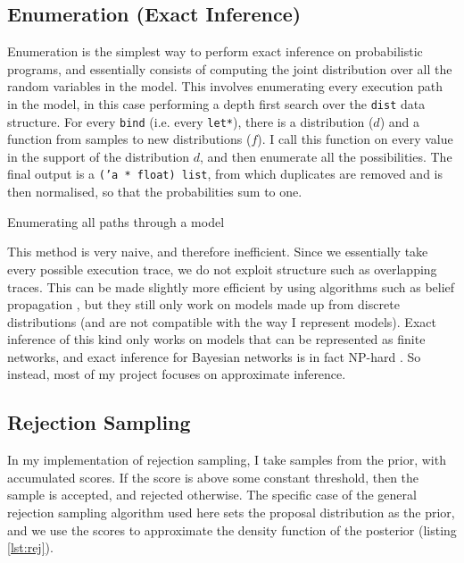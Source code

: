 \subsection{Enumeration (Exact Inference)} \label{sec:enum}
Enumeration is the simplest way to perform exact inference on probabilistic programs, and essentially consists of computing the joint distribution over all the random variables in the model. This involves enumerating every execution path in the model, in this case performing a depth first search over the \texttt{dist} data structure. For every \texttt{bind} (i.e. every \texttt{let*}), there is a distribution ($d$) and a function from samples to new distributions ($f$). I call this function on every value in the support of the distribution $d$, and then enumerate all the possibilities. The final output is a \texttt{('a * float) list}, from which duplicates are removed and is then normalised, so that the probabilities sum to one.
		
\begin{listing}[ht]
	\caption{Enumerating all paths through a model}
	\label{lst:enum}
\end{listing}
		
This method is very naive, and therefore inefficient. Since we essentially take every possible execution trace, we do not exploit structure such as overlapping traces. This can be made slightly more efficient by using algorithms such as belief propagation \cite{belief-prop}, but they still only work on models made up from discrete distributions (and are not compatible with the way I represent models). Exact inference of this kind only works on models that can be represented as finite networks, and exact inference for Bayesian networks is in fact NP-hard \cite{cooper1990computational}. So instead, most of my project focuses on approximate inference.
		
\subsection{Rejection Sampling} \label{sec:rej}
In my implementation of rejection sampling, I take samples from the prior, with accumulated scores. If the score is above some constant threshold, then the sample is accepted, and rejected otherwise. The specific case of the general rejection sampling algorithm used here sets the proposal distribution as the prior, and we use the scores to approximate the density function of the posterior (listing \ref{lst:rej}).
	
